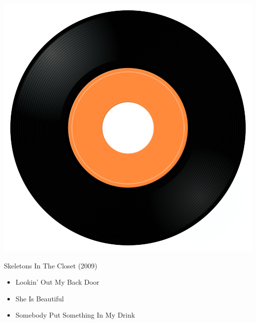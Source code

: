 \begin{minipage}[t]{0.25\textwidth}\vspace{0pt}
\captionsetup{type=figure}
\includegraphics[width=\textwidth]{Images/cover.png}
\caption*{Skeletons In The Closet (2009)}
\end{minipage}
\begin{minipage}[t]{0.25\textwidth}\vspace{0pt}
\begin{itemize}[nosep,leftmargin=1em,labelwidth=*,align=left]
	\setlength{\itemsep}{0pt}
	\item Lookin' Out My Back Door
	\item She Is Beautiful
	\item Somebody Put Something In My Drink
\end{itemize}
\end{minipage}
